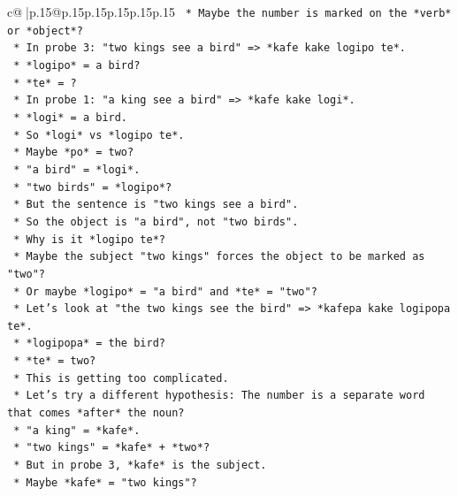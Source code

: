 \documentclass{article}
\begin{document}
{\begin{supertabular}{c@{$\;$}|p{.15\linewidth}@{}p{.15\linewidth}p{.15\linewidth}p{.15\linewidth}p{.15\linewidth}p{.15\linewidth}}
{{{\texttt{                *   Maybe the number is marked on the *verb* or *object*?} \\
\texttt{                *   In probe 3: "two kings see a bird" => *kafe kake logipo te*.} \\
\texttt{                    *   *logipo* = a bird?} \\
\texttt{                    *   *te* = ?} \\
\texttt{                *   In probe 1: "a king see a bird" => *kafe kake logi*.} \\
\texttt{                    *   *logi* = a bird.} \\
\texttt{                *   So *logi* vs *logipo te*.} \\
\texttt{                *   Maybe *po* = two?} \\
\texttt{                *   "a bird" = *logi*.} \\
\texttt{                *   "two birds" = *logipo*?} \\
\texttt{                *   But the sentence is "two kings see a bird".} \\
\texttt{                *   So the object is "a bird", not "two birds".} \\
\texttt{                *   Why is it *logipo te*?} \\
\texttt{                *   Maybe the subject "two kings" forces the object to be marked as "two"?} \\
\texttt{                *   Or maybe *logipo* = "a bird" and *te* = "two"?} \\
\texttt{                *   Let's look at "the two kings see the bird" => *kafepa kake logipopa te*.} \\
\texttt{                    *   *logipopa* = the bird?} \\
\texttt{                    *   *te* = two?} \\
\texttt{                *   This is getting too complicated.} \\
\texttt{                *   Let's try a different hypothesis: The number is a separate word that comes *after* the noun?} \\
\texttt{                *   "a king" = *kafe*.} \\
\texttt{                *   "two kings" = *kafe* + *two*?} \\
\texttt{                *   But in probe 3, *kafe* is the subject.} \\
\texttt{                *   Maybe *kafe* = "two kings"?} \\
}}}
\end{supertabular}}
\end{document}
